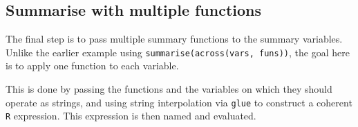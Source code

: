 \documentclass[]{book}
\newenvironment{Shaded}{}{}
\newcommand{\CommentTok}[1]{\textcolor[rgb]{0.38,0.63,0.69}{\textit{#1}}}
\newcommand{\DataTypeTok}[1]{\textcolor[rgb]{0.56,0.13,0.00}{#1}}
\newcommand{\KeywordTok}[1]{\textcolor[rgb]{0.00,0.44,0.13}{\textbf{#1}}}
\newcommand{\NormalTok}[1]{#1}
\newcommand{\OperatorTok}[1]{\textcolor[rgb]{0.40,0.40,0.40}{#1}}
\newcommand{\StringTok}[1]{\textcolor[rgb]{0.25,0.44,0.63}{#1}}
\begin{document}
\begin{Shaded}
\end{Shaded}

\hypertarget{summarise-with-multiple-functions}{%
\subsection{Summarise with multiple functions}\label{summarise-with-multiple-functions}}

The final step is to pass multiple summary functions to the summary variables.
Unlike the earlier example using \texttt{summarise(across(vars,\ funs))}, the goal here is to apply one function to each variable.

This is done by passing the functions and the variables on which they should operate as strings, and using string interpolation via \texttt{glue} to construct a coherent \texttt{R} expression. This expression is then named and evaluated.
\end{document}
